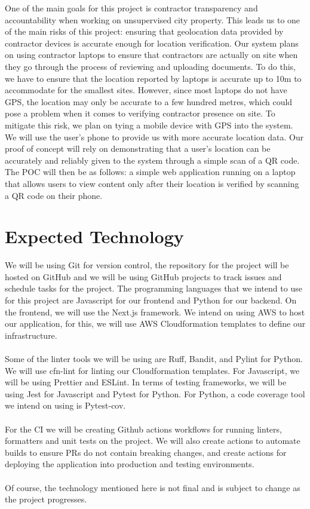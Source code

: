 \documentclass{article}
\begin{document}
One of the main goals for this project is contractor transparency and accountability when working on
unsupervised city property. This leads us to one of the main risks of this project: ensuring that geolocation
data provided by contractor devices is accurate enough for location verification. Our system plans on using
contractor laptops to ensure that contractors are actually on site when they go through the process of
reviewing and uploading documents. To do this, we have to ensure that the location reported by laptops is
accurate up to 10m to accommodate for the smallest sites. However, since most laptops do not have GPS, the
location may only be accurate to a few hundred metres, which could pose a problem when it comes to
verifying contractor presence on site. To mitigate this risk, we plan on tying a mobile device with GPS into the
system. We will use the user’s phone to provide us with more accurate location data. Our proof of concept will
rely on demonstrating that a user’s location can be accurately and reliably given to the system through a
simple scan of a QR code. The POC will then be as follows: a simple web application running on a laptop that
allows users to view content only after their location is verified by scanning a QR code on their phone.

\section{Expected Technology}

We will be using Git for version control, the repository for the project will be hosted on GitHub and we will be
using GitHub projects to track issues and schedule tasks for the project. The programming languages that we
intend to use for this project are Javascript for our frontend and Python for our backend. On the frontend, we
will use the Next.js framework. We intend on using AWS to host our application, for this, we will use AWS
Cloudformation templates to define our infrastructure.\\
\\
Some of the linter tools we will be using are Ruff, Bandit, and Pylint for Python. We will use cfn-lint for linting
our Cloudformation templates. For Javascript, we will be using Prettier and ESLint. In terms of testing
frameworks, we will be using Jest for Javascript and Pytest for Python. For Python, a code coverage tool we
intend on using is Pytest-cov.\\
\\
For the CI we will be creating Github actions workflows for running linters, formatters and unit tests on the
project. We will also create actions to automate builds to ensure PRs do not contain breaking changes, and
create actions for deploying the application into production and testing environments.\\
\\
Of course, the technology mentioned here is not final and is subject to change as the project progresses.
\end{document}
